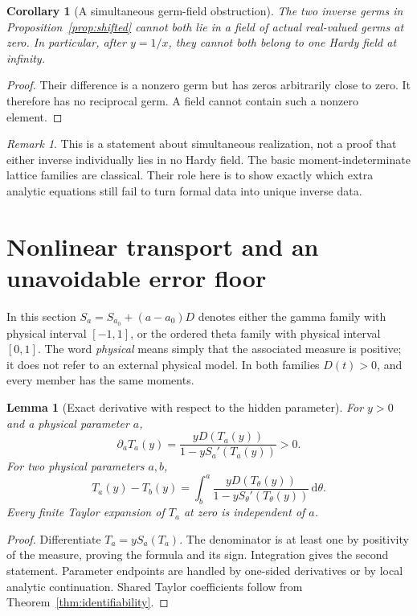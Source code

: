 \documentclass[11pt,a4paper]{article}
\numberwithin{equation}{section}
\newtheorem{lemma}[theorem]{Lemma}
\newtheorem{corollary}[theorem]{Corollary}
\theoremstyle{definition}
\theoremstyle{remark}
\newtheorem{remark}[theorem]{Remark}
\newcommand{\dd}{\,\mathrm d}
\begin{document}
\begin{corollary}[A simultaneous germ-field obstruction]
The two inverse germs in Proposition~\ref{prop:shifted} cannot both lie
in a field of actual real-valued germs at zero. In particular, after
\(y=1/x\), they cannot both belong to one Hardy field at infinity.
\end{corollary}
\begin{proof}
Their difference is a nonzero germ but has zeros arbitrarily close to
zero. It therefore has no reciprocal germ. A field cannot contain such
a nonzero element.
\end{proof}

\begin{remark}
This is a statement about simultaneous realization, not a proof that
either inverse individually lies in no Hardy field. The basic
moment-indeterminate lattice families are classical. Their role here is
to show exactly which extra analytic equations still fail to turn formal
data into unique inverse data.
\end{remark}

\section{Nonlinear transport and an unavoidable error floor}
\label{sec:transport}

In this section \(S_a=S_{a_0}+(a-a_0)D\) denotes either the gamma family
with physical interval \([-1,1]\), or the ordered theta family with
physical interval \([0,1]\). The word \emph{physical} means simply that
the associated measure is positive; it does not refer to an external
physical model. In both families \(D(t)>0\), and every member has the
same moments.

\begin{lemma}[Exact derivative with respect to the hidden parameter]
\label{lem:parameter-derivative}
For \(y>0\) and a physical parameter \(a\),
\begin{equation}
 \partial_aT_a(y)=
 \frac{yD(T_a(y))}{1-yS_a'(T_a(y))}>0.
 \label{eq:parameter-derivative}
\end{equation}
For two physical parameters \(a,b\),
\begin{equation}
 T_a(y)-T_b(y)
 =\int_b^a\frac{yD(T_\theta(y))}
                   {1-yS_\theta'(T_\theta(y))}\dd\theta.
 \label{eq:gap-integral}
\end{equation}
Every finite Taylor expansion of \(T_a\) at zero is independent of \(a\).
\end{lemma}
\begin{proof}
Differentiate \(T_a=yS_a(T_a)\). The denominator is at least one by
positivity of the measure, proving the formula and its sign. Integration
gives the second statement. Parameter endpoints are handled by one-sided
derivatives or by local analytic continuation. Shared Taylor
coefficients follow from Theorem~\ref{thm:identifiability}.
\end{proof}
\end{document}
